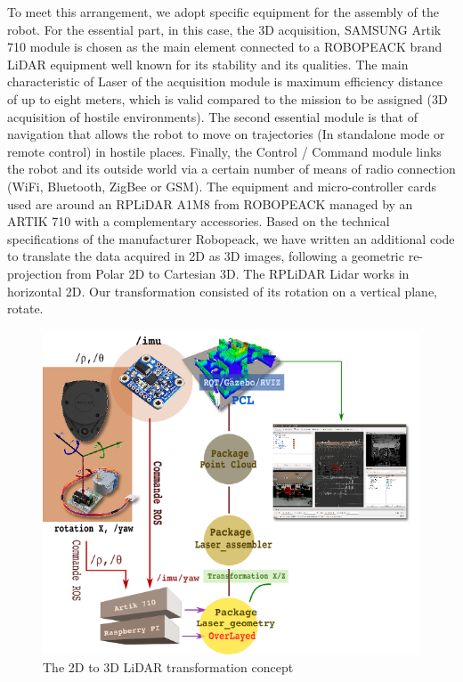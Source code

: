 \documentclass[Afour,sageh,times]{sagej}
\begin{document}
To meet this arrangement, we adopt specific equipment for the assembly of the robot. For the essential part, in this case, the 3D acquisition, SAMSUNG Artik 710 module is chosen as the main element connected to a ROBOPEACK brand LiDAR equipment well known for its stability and its qualities.
The main characteristic of Laser of the acquisition module is maximum efficiency distance of up to eight meters, which is valid compared to the mission to be assigned (3D acquisition of hostile environments).
The second essential module is that of navigation that allows the robot to move on trajectories (In standalone mode or remote control) in hostile places. Finally, the Control / Command module links the robot and its outside world via a certain number of means of radio connection (WiFi, Bluetooth, ZigBee or GSM).
The equipment and micro-controller cards used are around an RPLiDAR A1M8 from ROBOPEACK managed by an ARTIK 710 with a complementary accessories.
Based on the technical specifications of the manufacturer Robopeack, we have written an additional code to translate the data acquired in 2D as 3D images, following a geometric re-projection from Polar 2D to Cartesian 3D.
The RPLiDAR Lidar works in horizontal 2D. Our transformation consisted of its rotation on a vertical plane, rotate.

\begin{figure}
    \centering
    \includegraphics[scale=0.3]{scan.png}
    \caption{The 2D to 3D LiDAR transformation concept}
    \label{fig:3dlidar}
\end{figure}
\end{document}
